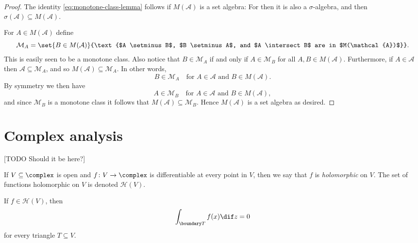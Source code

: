 \documentclass[article, a4paper, 11pt, oneside]{memoir}
\numberwithin{equation}{chapter}
\newcommand{\calM}{\mathcal{M}}
\newcommand{\calA}{\mathcal{A}}
\begin{document}
\begin{proof}
    The identity \cref{eq:monotone-class-lemma} follows if $M(\calA)$ is a set algebra: For then it is also a $\sigma$-algebra, and then $\sigma(\calA) \subseteq M(\calA)$.

    For $A \in M(\calA)$ define
    \begin{equation*}
        \calM_A
            = \set{B \in M(\calA)}{\text{$A \setminus B$, $B \setminus A$, and $A \intersect B$ are in $M(\calA)$}}.
    \end{equation*}
    This is easily seen to be a monotone class. Also notice that $B \in \calM_A$ if and only if $A \in \calM_B$ for all $A,B \in M(\calA)$. Furthermore, if $A \in \calA$ then $\calA \subseteq \calM_A$, and so $M(\calA) \subseteq \calM_A$. In other words,
    \begin{equation*}
        B \in \calM_A
        \quad
        \text{for $A \in \calA$ and $B \in M(\calA)$}.
    \end{equation*}
    By symmetry we then have
    \begin{equation*}
        A \in \calM_B
        \quad
        \text{for $A \in \calA$ and $B \in M(\calA)$},
    \end{equation*}
    and since $\calM_B$ is a monotone class it follows that $M(\calA) \subseteq \calM_B$. Hence $M(\calA)$ is a set algebra as desired.
\end{proof}


\chapter{Complex analysis}

[TODO Should it be here?]

\newcommand{\diam}{\operatorname{diam}}
\newcommand{\hol}{\mathcal{H}}

If $V \subseteq \complex$ is open and $f \colon V \to \complex$ is differentiable at every point in $V$, then we say that $f$ is \emph{holomorphic} on $V$. The set of functions holomorphic on $V$ is denoted $\hol(V)$.

\begin{theorem}
    If $f \in \hol(V)$, then
    \begin{equation*}
        \int_{\boundary T} f(x) \dif z = 0
    \end{equation*}
    for every triangle $T \subseteq V$.
\end{theorem}
\end{document}
